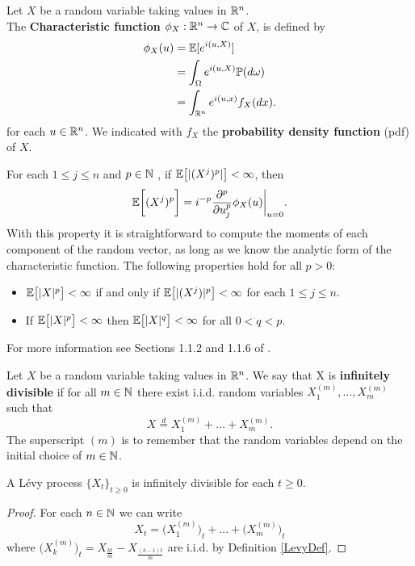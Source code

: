 \begin{Definition} \label{chf}
Let $X$ be a random variable taking values in $\mathbb{R}^n$.\\ 
The \textbf{Characteristic function} $\phi_X:\mathbb{R}^n \to \mathbb{C}$  of $X$, is defined by
\begin{align}
\phi_{X}(u) &= \mathbb{E} [e^{i(u,X)}] \nonumber \\
            &= \int_{\Omega} e^{i(u,X)} \mathbb{P}(d\omega) \nonumber \\
            &= \int_{\mathbb{R}^n} e^{i(u,x)} f_X(dx).
\end{align}
for each $u \in \mathbb{R}^n$. We indicated with $f_X$ the \textbf{probability density function} (pdf) of $X$.
\end{Definition}
For each $1 \leq j \leq n$ and $p \in \mathbb{N}$ , if $\mathbb{E}\bigl[ |(X^j)^{p}| \bigr] < \infty$, then 
\begin{equation}\label{moments}
 \mathbb{E}\biggl[ (X^j)^{p} \biggr] = i^{-p}\frac{\partial^p}{\partial u_j^{p}} \phi_X(u) \biggr|_{u=0} .
\end{equation}
With this property it is straightforward to compute the moments of each component of the random vector, as long as we know the analytic form 
of the characteristic function.
The following properties hold for all $p>0$:
\begin{itemize}
 \item $\mathbb{E} \bigl[ |X|^p \bigr] < \infty $ if and only if $\mathbb{E} \bigl[ |(X^j)|^p \bigr] < \infty $ for each $1 \leq j \leq n$. 
 \item If $\mathbb{E} \bigl[ |X|^p \bigr] < \infty $ then $\mathbb{E} \bigl[ |X|^q \bigr] < \infty $ for all $0 < q < p$.
\end{itemize}
For more information see Sections 1.1.2 and 1.1.6 of \cite{Applebaum}.
\begin{Definition}\label{inf_div}
Let $X$ be a random variable taking values in $\mathbb{R}^n$.
We say that X is \textbf{infinitely divisible} if for all $m \in \mathbb{N}$ there exist i.i.d. random variables $X_1^{(m)},...,X_m^{(m)}$
 such that
 \begin{equation}
  X \overset{d}{=} X_1^{(m)} + ... + X_m^{(m)}.
 \end{equation}
 The superscript $(m)$ is to remember that the random variables depend on the initial choice of $m\in \mathbb{N}$.
\end{Definition}

\begin{Theorem}
 A Lévy process $\{X_t\}_{t \ge 0}$ is infinitely divisible for each $t\geq0$. 
\end{Theorem}
\begin{proof}
 For each $n \in \mathbb{N}$ we can write 
 $$ X_t = \bigl( X_1^{(m)} \bigr)_t + ... + \bigl( X_m^{(m)} \bigr)_t $$
 where $ \bigl( X_k^{(m)} \bigr)_t = X_{\frac{kt}{m}} - X_{\frac{(k-1)t}{m}} $ are i.i.d. by Definition \ref{LevyDef}.
\end{proof}

